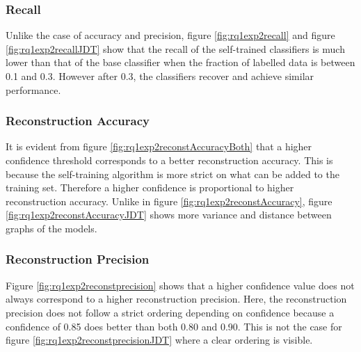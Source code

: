 \documentclass[../main.tex]{subfiles}
\begin{document}
\subsubsection{Recall}


Unlike the case of accuracy and precision, figure \ref{fig:rq1exp2recall} and figure \ref{fig:rq1exp2recallJDT} show that the recall of the self-trained classifiers is much lower than that of the base classifier when the fraction of labelled data is between 0.1 and 0.3. However after 0.3, the classifiers recover and achieve similar performance. 

\subsubsection{Reconstruction Accuracy}


It is evident from figure \ref{fig:rq1exp2reconstAccuracyBoth} that a higher confidence threshold corresponds to a better reconstruction accuracy. This is because the self-training algorithm is more strict on what can be added to the training set. Therefore a higher confidence is proportional to higher reconstruction accuracy. Unlike in figure \ref{fig:rq1exp2reconstAccuracy}, figure \ref{fig:rq1exp2reconstAccuracyJDT} shows more variance and distance between graphs of the models. 

\subsubsection{Reconstruction Precision}


Figure \ref{fig:rq1exp2reconstprecision} shows that a higher confidence value does not always correspond to a higher reconstruction precision. Here, the reconstruction precision does not follow a strict ordering depending on confidence because a confidence of 0.85 does better than both 0.80 and 0.90. This is not the case for figure \ref{fig:rq1exp2reconstprecisionJDT} where a clear ordering is visible.
\end{document}
